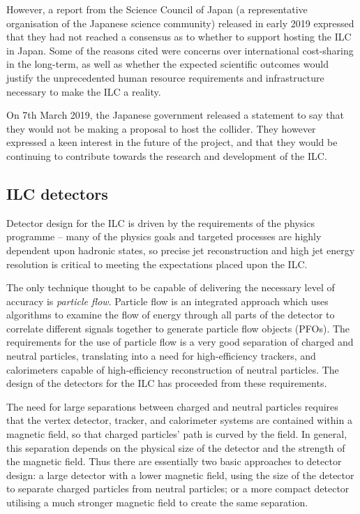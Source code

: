 However, a report from the Science Council of Japan (a representative organisation of the Japanese science community) released in early 2019 expressed that they had not reached a consensus as to whether to support hosting the \acrshort{ILC} in Japan. Some  of the reasons cited were concerns over international cost-sharing in the long-term, as well as whether the expected scientific outcomes would justify the unprecedented human resource requirements and infrastructure necessary to make the \acrshort{ILC} a reality\cite{linearcolliders-scj-report}.

On 7th March 2019, the Japanese government released a statement to say that they would not be making a proposal to host the collider\cite{japan-ilc-decision}. They however expressed a keen interest in the future of the project, and that they would be continuing to contribute towards the research and development of the \acrshort{ILC}.

\subsection{ILC detectors}
\label{section:ILC-detectors}
Detector design for the \acrshort{ILC} is driven by the requirements of the physics programme -- many of the physics goals and targeted processes are highly dependent upon hadronic states, so precise jet reconstruction and high jet energy resolution is critical to meeting the expectations placed upon the \acrshort{ILC}. 

The only technique thought to be capable of delivering the necessary level of accuracy is \textit{particle flow}. Particle flow is an integrated approach which uses algorithms to examine the flow of energy through all parts of the detector to correlate different signals together to generate particle flow objects (\acrshort{PFO}s). The requirements for the use of particle flow is a very good separation of charged and neutral particles, translating into a need for high-efficiency trackers, and calorimeters capable of high-efficiency reconstruction of neutral particles. The design of the detectors for the \acrshort{ILC} has proceeded from these requirements.

The need for large separations between charged and neutral particles requires that the vertex detector, tracker, and calorimeter systems are contained within a magnetic field, so that charged particles' path is curved by the field. In general, this separation depends on the physical size of the detector and the strength of the magnetic field. Thus there are essentially two basic approaches to detector design: a large detector with a lower magnetic field, using the size of the detector to separate charged particles from neutral particles; or a more compact detector utilising a much stronger magnetic field to create the same separation.

